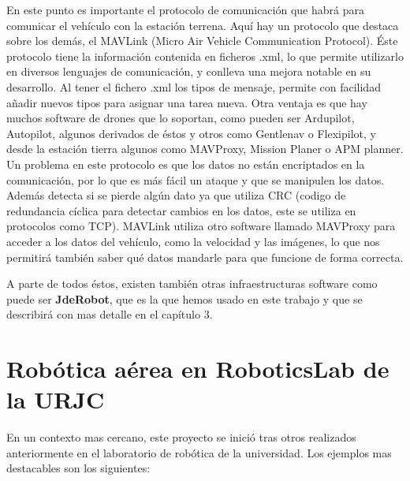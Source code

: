 \hspace{1 cm} En este punto es importante el protocolo de comunicaci\'on que habr\'a para comunicar el veh\'iculo con la estaci\'on terrena. Aqu\'i hay un protocolo que destaca sobre los dem\'as, el MAVLink (Micro Air Vehicle Communication Protocol). \'Este protocolo tiene la informaci\'on contenida en ficheros .xml, lo que permite utilizarlo en diversos lenguajes de comunicaci\'on, y conlleva una mejora notable en su desarrollo. Al tener el fichero .xml los tipos de mensaje, permite con facilidad añadir nuevos tipos para asignar una tarea nueva. Otra ventaja es que hay muchos software de drones que lo soportan, como pueden ser Ardupilot, Autopilot, algunos derivados de \'estos y otros como Gentlenav o Flexipilot, y desde la estaci\'on tierra algunos como MAVProxy, Mission Planer o APM planner. 
Un problema en este protocolo es que los datos no est\'an encriptados en la comunicaci\'on, por lo que es m\'as f\'acil un ataque y que se manipulen los datos. Adem\'as detecta si se pierde alg\'un dato ya que utiliza CRC (codigo de redundancia c\'iclica para detectar cambios en los datos, este se utiliza en protocolos como TCP).
MAVLink utiliza otro software llamado MAVProxy para acceder a los datos del veh\'iculo, como la velocidad y las im\'agenes, lo que nos permitir\'a tambi\'en saber qu\'e datos mandarle para que funcione de forma correcta. 

\hspace{1 cm} A parte de todos \'estos, existen tambi\'en otras infraestructuras software como puede ser \textbf{JdeRobot}, que es la que hemos usado en este trabajo y que se describir\'a con mas detalle en el cap\'itulo 3. 


	

\section{Rob\'otica a\'erea en RoboticsLab de la URJC}
\hspace{1 cm} En un contexto mas cercano, este proyecto se inici\'o tras otros realizados anteriormente en el laboratorio de rob\'otica de la universidad. Los ejemplos mas destacables son los siguientes:



